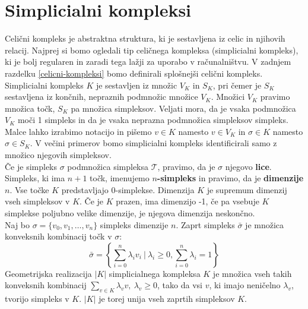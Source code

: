 \documentclass[a4paper, 12pt]{book}
\theoremstyle{definition}
\theoremstyle{remark}
\begin{document}
\section{Simplicialni kompleksi}
Celični kompleks je abstraktna struktura, ki je sestavljena iz celic in njihovih
relacij. Najprej si bomo ogledali tip celičnega kompleksa (simplicialni kompleks),
ki je bolj regularen in zaradi tega lažji za uporabo v računalništvu. V zadnjem 
razdelku \ref{celicni-kompleksi} bomo definirali splošnejši celični kompleks.\\
Simplicialni kompleks $K$ je sestavljen iz množic $V_K$ in $S_K$, pri čemer je
$S_K$ sestavljena iz končnih, nepraznih podmnožic množice $V_K$.
Množici $V_K$ pravimo množica točk, $S_K$ pa množica simpleksov. Veljati mora, da
je vsaka podmnožica $V_K$ moči 1 simpleks in da je vsaka neprazna podmnožica
simpleksov simpleks. Malce lahko izrabimo notacijo in pišemo $v \in K$ namesto
$v \in V_K$ in $\sigma \in K$ namesto $\sigma \in S_K$. V večini primerov bomo
simplicialni kompleks identificirali samo z množico njegovih simpleksov.\\
Če je simpleks $\sigma$ podmnožica simpleksa $\mathcal{T}$, pravimo, da je $\sigma$ njegovo \textbf{lice}.
Simpleks, ki ima $n+1$ točk, imenujemo \textbf{$n$-simpleks} in pravimo, da je \textbf{dimenzije} $n$.
Vse točke $K$ predstavljajo 0-simplekse. Dimenzija $K$ je supremum dimenzij
vseh simpleksov v $K$. Če je $K$ prazen, ima dimenzijo -1, če pa vsebuje $K$ simplekse
poljubno velike dimenzije, je njegova dimenzija neskončno.\\
Naj bo $\sigma = \{v_0,v_1,\dots,v_n\}$ simpleks dimenzije $n$. Zaprt simpleks
$\bar{\sigma}$ je množica konveksnih kombinacij točk v $\sigma$:
\[
  \bar{\sigma} = \left\{\sum_{i=0}^n \lambda_i v_i\ |\ \lambda_i \geq 0, \sum_{i=0}^n \lambda_i = 1\right\}
\]
Geometrijska realizacija $|K|$ simplicialnega kompleksa $K$ je množica 
vseh takih konveksnih kombinacij $\sum_{v\in K} \lambda_v v,\ \lambda_v \geq 0$, tako da vsi $v$, ki imajo
neničelno $\lambda_v$, tvorijo simpleks v $K$. $|K|$ je torej unija vseh zaprtih
simpleksov $K$.
\end{document}
